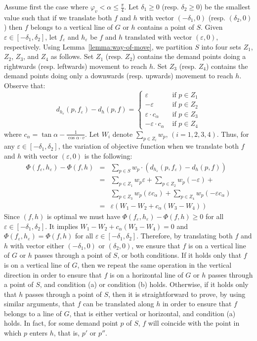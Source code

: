 \documentclass[11pt,a4paper,oneside,onecolumn]{article}
\def\eps{\varepsilon}
\def\QED{\ensuremath{{\square}}}
\def\markatright#1{\leavevmode\unskip\nobreak\quad\hspace*{\fill}{#1}}
\newenvironment{proof}
{\begin{trivlist}\item[\hskip\labelsep{\bf Proof.}]}
{\markatright{\QED}\end{trivlist}}
\begin{document}
\begin{proof}
Assume first the case where $\varphi_v<\alpha\leq\frac{\pi}{4}$. Let
$\delta_1\geq 0$ (resp. $\delta_2\geq 0$) be the smallest value such
that if we translate both $f$ and $h$ with vector $(-\delta_1,0)$
(resp. $(\delta_2,0)$) then $f$ belongs to a vertical line of $G$ or
$h$ contains a point of $S$. Given $\eps\in[-\delta_1,\delta_2]$,
let $f_{\eps}$ and $h_{\eps}$ be $f$ and $h$ translated with vector
$(\eps,0)$, respectively. Using Lemma~\ref{lemma:way-of-move}, we
partition $S$ into four sets $Z_1$, $Z_2$, $Z_3$, and $Z_4$ as
follows. Set $Z_1$ (resp. $Z_2$) contains the demand points doing a
rightwards (resp. leftwards) movement to reach $h$. Set $Z_3$ (resp.
$Z_4$) contains the demand points doing only a downwards (resp.
upwards) movement to reach $h$. Observe that:
$$d_{h_{\eps}}(p,f_{\eps})-d_h(p,f)=\left\{
\begin{array}{cr}
  \eps & \text{ if }p\in Z_1\\
  -\eps & \text{ if }p\in Z_2\\
  \eps\cdot c_{\alpha} & \text{ if }p\in Z_3\\
  -\eps\cdot c_{\alpha} & \text{ if }p\in Z_4
\end{array}
\right.$$ where $c_{\alpha}=\tan\alpha-\frac{1}{\cos\alpha\cdot v}$.
Let $W_i$ denote $\sum_{p\in Z_i}w_p$, $(i=1,2,3,4)$. Thus, for any
$\eps\in[-\delta_1,\delta_2]$, the variation of objective function
when we translate both $f$ and $h$ with vector $(\eps,0)$ is the
following:
\begin{eqnarray*}
\Phi(f_{\eps},h_{\eps})-\Phi(f,h)
  &=& \sum_{p\in S}w_p\cdot\left(d_{h_{\eps}}(p,f_{\eps})- d_{h}(p,f)\right)\\
  &=& \sum_{p\in Z_1}w_p\eps+\sum_{p\in Z_2}w_p(-\eps)+\\
  & & \sum_{p\in Z_3}w_p(\eps c_{\alpha})+
      \sum_{p\in Z_4}w_p\left(-\eps c_{\alpha}\right)\\
  &=&\eps\left(W_1-W_2+c_{\alpha}(W_3-W_4)\right)
\end{eqnarray*}
Since $(f,h)$ is optimal we must have
$\Phi(f_{\eps},h_{\eps})-\Phi(f,h)\geq 0$ for all
$\eps\in[-\delta_1,\delta_2]$. It implies
$W_1-W_2+c_{\alpha}(W_3-W_4)=0$ and
$\Phi(f_{\eps},h_{\eps})=\Phi(f,h)$ for all
$\eps\in[-\delta_1,\delta_2]$. Therefore, by translating both $f$
and $h$ with vector either $(-\delta_1,0)$ or $(\delta_2,0)$, we
ensure that $f$ is on a vertical line of $G$ or $h$ passes through a
point of $S$, or both conditions. If it holds only that $f$ is on a
vertical line of $G$, then we repeat the same operation in the
vertical direction in order to ensure that $f$ is on a horizontal
line of $G$ or $h$ passes through a point of $S$, and condition (a)
or condition (b) holds. Otherwise, if it holds only that $h$ passes
through a point of $S$, then it is straightforward to prove, by
using similar arguments, that $f$ can be translated along $h$ in
order to ensure that $f$ belongs to a line of $G$, that is either vertical or
horizontal, and condition (a) holds. In fact, for some demand point
$p$ of $S$, $f$ will coincide with the point in which $p$ enters
$h$, that is, $p'$ or $p''$.


\end{proof}
\end{document}
